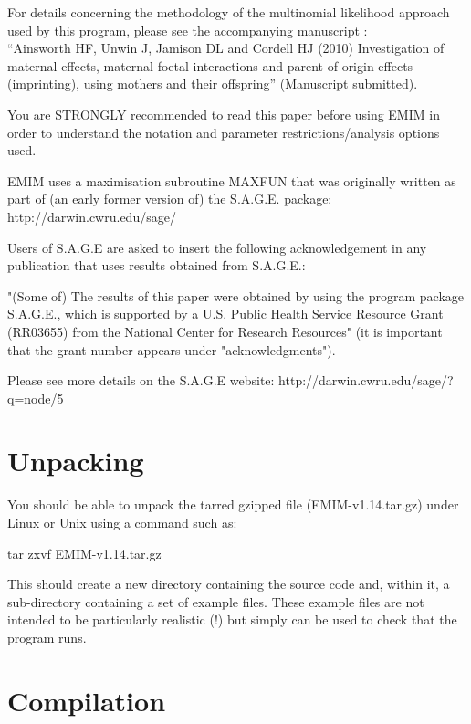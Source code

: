 \documentclass[a4paper,11pt]{report}
\begin{document}
For details concerning the methodology of the multinomial
likelihood approach used by this program, please see
the accompanying manuscript \citep{ainsworth:etal:10}:
\\
``Ainsworth HF, Unwin J, Jamison DL and Cordell HJ (2010) Investigation of maternal 
effects,  maternal-foetal interactions and parent-of-origin 
effects (imprinting), using mothers and their offspring''
(Manuscript submitted). 

You are STRONGLY recommended to read this 
paper before using EMIM in order to understand the notation and 
parameter restrictions/analysis options used.

\bigskip

EMIM uses a maximisation subroutine MAXFUN that was originally 
written as part of (an early former version of) the S.A.G.E. package:
http://darwin.cwru.edu/sage/

Users of S.A.G.E are asked to insert the following acknowledgement 
in any publication that uses results obtained from S.A.G.E.:

"(Some of) The results of this paper were obtained by using the 
program package S.A.G.E., which is supported by a U.S. Public 
Health Service Resource Grant (RR03655) from the National Center 
for Research Resources" (it is important that the grant number 
appears under "acknowledgments"). 

Please see more details on the S.A.G.E website:
http://darwin.cwru.edu/sage/?q=node/5


\newpage

\section*{Unpacking}


You should be able to unpack the tarred gzipped file (EMIM-v1.14.tar.gz) under Linux or Unix using a command such as:

tar zxvf EMIM-v1.14.tar.gz

This should create a new directory containing the source code and, within it, a sub-directory containing a set of example files. These  example files are not intended to be particularly realistic (!) but simply can be used to check that the program runs.



\section*{Compilation}
\end{document}
